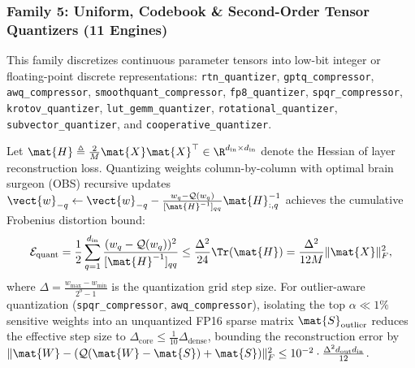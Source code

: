 \subsubsection{Family 5: Uniform, Codebook \& Second-Order Tensor Quantizers (11 Engines)}
This family discretizes continuous parameter tensors into low-bit integer or floating-point discrete representations: \texttt{rtn\_quantizer}, \texttt{gptq\_compressor}, \texttt{awq\_compressor}, \texttt{smoothquant\_compressor}, \texttt{fp8\_quantizer}, \texttt{spqr\_compressor}, \texttt{krotov\_quantizer}, \texttt{lut\_gemm\_quantizer}, \texttt{rotational\_quantizer}, \texttt{subvector\_quantizer}, and \texttt{cooperative\_quantizer}.
\begin{theorem}
\label{thm:frob_quant_family}
Let $\mat{H} \triangleq \frac{2}{M}\mat{X}\mat{X}^\top \in \R^{d_{\text{in}} \times d_{\text{in}}}$ denote the Hessian of layer reconstruction loss. Quantizing weights column-by-column with optimal brain surgeon (OBS) recursive updates $\vect{w}_{-q} \leftarrow \vect{w}_{-q} - \frac{w_q - \mathcal{Q}(w_q)}{[\mat{H}^{-1}]_{qq}} \mat{H}^{-1}_{:, q}$ achieves the cumulative Frobenius distortion bound:
\begin{equation}
\mathcal{E}_{\text{quant}} = \frac{1}{2} \sum_{q=1}^{d_{\text{in}}} \frac{(w_q - \mathcal{Q}(w_q))^2}{[\mat{H}^{-1}]_{qq}} \le \frac{\Delta^2}{24} \Tr(\mat{H}) = \frac{\Delta^2}{12 M} \|\mat{X}\|_F^2,
\label{eq:frob_bound_quant_family}
\end{equation}
where $\Delta = \frac{w_{\max} - w_{\min}}{2^b - 1}$ is the quantization grid step size. For outlier-aware quantization (\texttt{spqr\_compressor}, \texttt{awq\_compressor}), isolating the top $\alpha \ll 1\%$ sensitive weights into an unquantized FP16 sparse matrix $\mat{S}_{\text{outlier}}$ reduces the effective step size to $\Delta_{\text{core}} \le \frac{1}{10}\Delta_{\text{dense}}$, bounding the reconstruction error by $\|\mat{W} - (\mathcal{Q}(\mat{W} - \mat{S}) + \mat{S})\|_F^2 \le 10^{-2} \cdot \frac{\Delta^2 d_{\text{out}} d_{\text{in}}}{12}$.
\end{theorem}

